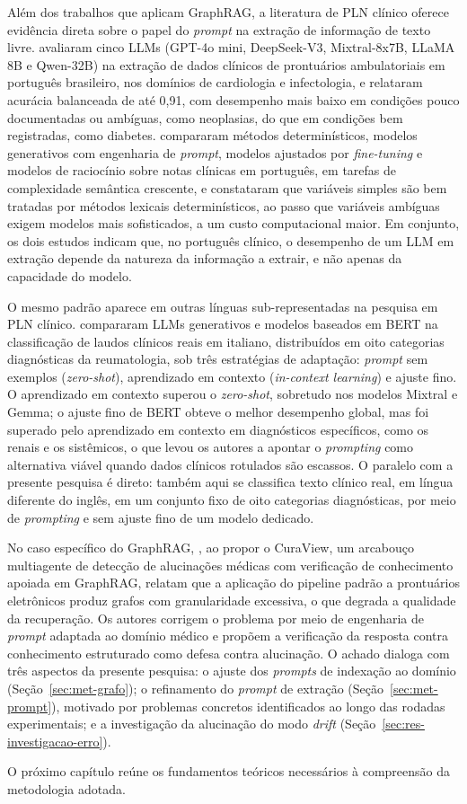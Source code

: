 Além dos trabalhos que aplicam GraphRAG, a literatura de PLN clínico oferece evidência direta sobre o papel do \textit{prompt} na extração de informação de texto livre. \citet{jesus2026} avaliaram cinco LLMs (GPT-4o mini, DeepSeek-V3, Mixtral-8x7B, LLaMA 8B e Qwen-32B) na extração de dados clínicos de prontuários ambulatoriais em português brasileiro, nos domínios de cardiologia e infectologia, e relataram acurácia balanceada de até 0,91, com desempenho mais baixo em condições pouco documentadas ou ambíguas, como neoplasias, do que em condições bem registradas, como diabetes. \citet{pereira2026} compararam métodos determinísticos, modelos generativos com engenharia de \textit{prompt}, modelos ajustados por \textit{fine-tuning} e modelos de raciocínio sobre notas clínicas em português, em tarefas de complexidade semântica crescente, e constataram que variáveis simples são bem tratadas por métodos lexicais determinísticos, ao passo que variáveis ambíguas exigem modelos mais sofisticados, a um custo computacional maior. Em conjunto, os dois estudos indicam que, no português clínico, o desempenho de um LLM em extração depende da natureza da informação a extrair, e não apenas da capacidade do modelo.

O mesmo padrão aparece em outras línguas sub-representadas na pesquisa em PLN clínico. \citet{lilli2025} compararam LLMs generativos e modelos baseados em BERT na classificação de laudos clínicos reais em italiano, distribuídos em oito categorias diagnósticas da reumatologia, sob três estratégias de adaptação: \textit{prompt} sem exemplos (\textit{zero-shot}), aprendizado em contexto (\textit{in-context learning}) e ajuste fino. O aprendizado em contexto superou o \textit{zero-shot}, sobretudo nos modelos Mixtral e Gemma; o ajuste fino de BERT obteve o melhor desempenho global, mas foi superado pelo aprendizado em contexto em diagnósticos específicos, como os renais e os sistêmicos, o que levou os autores a apontar o \textit{prompting} como alternativa viável quando dados clínicos rotulados são escassos. O paralelo com a presente pesquisa é direto: também aqui se classifica texto clínico real, em língua diferente do inglês, em um conjunto fixo de oito categorias diagnósticas, por meio de \textit{prompting} e sem ajuste fino de um modelo dedicado.

No caso específico do GraphRAG, \citet{ye2026}, ao propor o CuraView, um arcabouço multiagente de detecção de alucinações médicas com verificação de conhecimento apoiada em GraphRAG, relatam que a aplicação do pipeline padrão a prontuários eletrônicos produz grafos com granularidade excessiva, o que degrada a qualidade da recuperação. Os autores corrigem o problema por meio de engenharia de \textit{prompt} adaptada ao domínio médico e propõem a verificação da resposta contra conhecimento estruturado como defesa contra alucinação. O achado dialoga com três aspectos da presente pesquisa: o ajuste dos \textit{prompts} de indexação ao domínio (Seção~\ref{sec:met-grafo}); o refinamento do \textit{prompt} de extração (Seção~\ref{sec:met-prompt}), motivado por problemas concretos identificados ao longo das rodadas experimentais; e a investigação da alucinação do modo \textit{drift} (Seção~\ref{sec:res-investigacao-erro}).

O próximo capítulo reúne os fundamentos teóricos necessários à compreensão da metodologia adotada.
